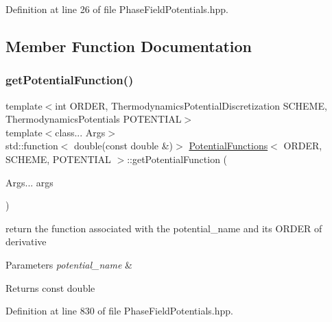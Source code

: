 Definition at line 26 of file Phase\+Field\+Potentials.\+hpp.



\subsection{Member Function Documentation}
\mbox{\label{classPotentialFunctions_af7b46074a256a70b110ae621d0335874}} 
\subsubsection{\texorpdfstring{get\+Potential\+Function()}{getPotentialFunction()}}
{\footnotesize\ttfamily template$<$int O\+R\+D\+ER, Thermodynamics\+Potential\+Discretization S\+C\+H\+E\+ME, Thermodynamics\+Potentials P\+O\+T\+E\+N\+T\+I\+AL$>$ \\
template$<$class... Args$>$ \\
std\+::function$<$ double(const double \&)$>$ \hyperlink{classPotentialFunctions}{Potential\+Functions}$<$ O\+R\+D\+ER, S\+C\+H\+E\+ME, P\+O\+T\+E\+N\+T\+I\+AL $>$\+::get\+Potential\+Function (\begin{DoxyParamCaption}\item[{Args...}]{args }\end{DoxyParamCaption})}



return the function associated with the potential\+\_\+name and its O\+R\+D\+ER of derivative 


\begin{DoxyParams}{Parameters}
{\em potential\+\_\+name} & \\
\hline
\end{DoxyParams}
\begin{DoxyReturn}{Returns}
const double 
\end{DoxyReturn}


Definition at line 830 of file Phase\+Field\+Potentials.\+hpp.



